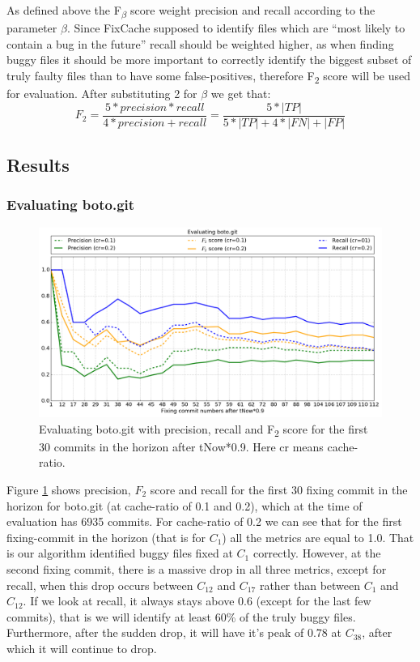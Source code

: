 \documentclass[12pt,twoside,notitlepage]{report}
\newcommand{\fxch}{FixCache}
\begin{document}
As defined above the F\textsubscript{$\beta$} score weight precision and recall according to the parameter $\beta$. Since \fxch{} supposed to identify files which are ``most likely to contain a bug in the future'' recall should be weighted higher, as when finding buggy files it should be more important to correctly identify the biggest subset of truly faulty files than to have some false-positives, therefore F\textsubscript{2} score will be used for evaluation. After substituting 2 for $\beta$ we get that:
\[
	F_2 = \frac{5 * precision * recall}{4 * precision + recall} = \frac{5 * |TP|}{5 * |TP| + 4 * |FN| + |FP|}
\]
\clearpage
\subsection{Results}
\subsubsection{Evaluating boto.git}
\begin{figure}[ht!]
\includegraphics[width=1.0\textwidth]{evaluating_boto.png}
\caption[Evaluating boto.git: recall, precision and $F_2$ score]{Evaluating boto.git with precision, recall and F\textsubscript{2} score for the first 30 commits in the horizon after tNow*0.9. Here cr means cache-ratio.}
\label{evaluating_boto}
\end{figure}
Figure \ref{evaluating_boto} shows precision, $F_2$ score and recall for the first 30 fixing commit in the horizon for boto.git (at cache-ratio of 0.1 and 0.2), which at the time of evaluation has 6935 commits. For cache-ratio of 0.2 we can see that for the first fixing-commit in the horizon (that is for $C_1$) all the metrics are equal to 1.0. That is our algorithm identified buggy files fixed at $C_1$ correctly. However, at the second fixing commit, there is a massive drop in all three metrics, except for recall, when this drop occurs between $C_{12}$ and $C_{17}$ rather than between $C_1$ and $C_{12}$. If we look at recall, it always stays above 0.6 (except for the last few commits), that is we will identify at least 60\% of the truly buggy files. Furthermore, after the sudden drop, it will have it's peak of 0.78 at $C_{38}$, after which it will continue to drop.
\end{document}
